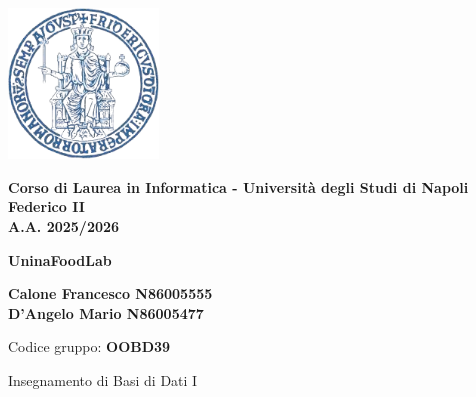 \documentclass[11pt]{article}
\begin{document}
\thispagestyle{firstpage}


\begin{center}
    \includegraphics[width=0.3\textwidth]{latex/immagini/uni_logo.png} 
    \vspace{0.5cm}

    {\large \textbf{Corso di Laurea in Informatica - Università degli Studi di Napoli Federico II}}\\
    {\large \textbf{A.A. 2025/2026}}\\[1cm]
    \vspace{1cm}

    {\Huge \color{myblue} \textbf{UninaFoodLab}}\\[2cm]

    \begin{flushleft}
    \centering
    {\large
    \textbf{Calone Francesco N86005555}\\
    \vspace{0.2cm}
    \textbf{D'Angelo Mario N86005477}\\
    }
    
    \vspace{0.2cm}
    {\small Codice gruppo: \textbf{OOBD39}}\\
    \vspace{0.8cm} 

    {\small Insegnamento di Basi di Dati I}
    \end{flushleft}
\end{center}


\newpage

\pagestyle{normal}

\tableofcontents
\thispagestyle{normal}










\end{document}
